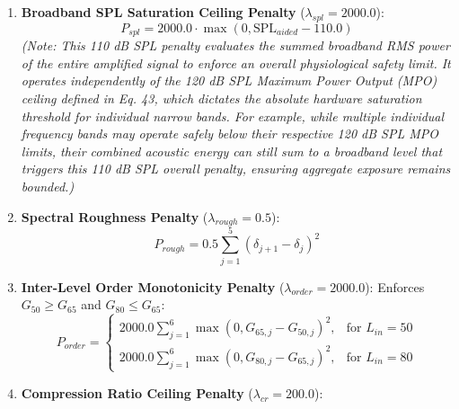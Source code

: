 \documentclass[
  12pt,
]{article}
\providecommand{\tightlist}{%
  \setlength{\itemsep}{0pt}\setlength{\parskip}{0pt}}
\begin{document}
\begin{enumerate}
  \begin{itemize}
  \tightlist
  \item
    Reverse-slope restriction (\(L_{in} \ge 75\) dB SPL and low-to-high
    threshold difference \(> 10\) dB):
    \(\text{Cap} = \text{Cap}_{base} - 0.10 \cdot (\overline{\text{HTL}}_{\le 500} - \overline{\text{HTL}}_{\ge 4000})\).
  \item
    Conductive air-bone gap adjustment:
    \(\text{Cap} \leftarrow \text{Cap} - 0.25 \cdot \text{PTA}_{ABG}\)
    (if \(L_{in} \ge 75\) dB SPL) or \(+0.10 \cdot \text{PTA}_{ABG}\)
    (if \(L_{in} < 75\) dB SPL).
  \end{itemize}
\item
  \textbf{Broadband SPL Saturation Ceiling Penalty}
  (\(\lambda_{spl} = 2000.0\)): \begin{equation}
  P_{spl} = 2000.0 \cdot \max\left(0, \text{SPL}_{aided} - 110.0\right)
  \end{equation} \emph{(Note: This 110 dB SPL penalty evaluates the
  summed broadband RMS power of the entire amplified signal to enforce
  an overall physiological safety limit. It operates independently of
  the 120 dB SPL Maximum Power Output (MPO) ceiling defined in Eq. 43,
  which dictates the absolute hardware saturation threshold for
  individual narrow bands. For example, while multiple individual
  frequency bands may operate safely below their respective 120 dB SPL
  MPO limits, their combined acoustic energy can still sum to a
  broadband level that triggers this 110 dB SPL overall penalty,
  ensuring aggregate exposure remains bounded.)}
\item
  \textbf{Spectral Roughness Penalty} (\(\lambda_{rough} = 0.5\)):
  \begin{equation}
  P_{rough} = 0.5 \sum_{j=1}^5 (\delta_{j+1} - \delta_j)^2
  \end{equation}
\item
  \textbf{Inter-Level Order Monotonicity Penalty}
  (\(\lambda_{order} = 2000.0\)): Enforces \(G_{50} \ge G_{65}\) and
  \(G_{80} \le G_{65}\): \begin{equation}
  P_{order} = \begin{cases} 
  2000.0 \sum_{j=1}^6 \max(0, G_{65, j} - G_{50, j})^2, & \text{for } L_{in} = 50 \\ 
  2000.0 \sum_{j=1}^6 \max(0, G_{80, j} - G_{65, j})^2, & \text{for } L_{in} = 80 
  \end{cases}
  \end{equation}
\item
  \textbf{Compression Ratio Ceiling Penalty} (\(\lambda_{cr} = 200.0\)):

\end{enumerate}
\end{document}
